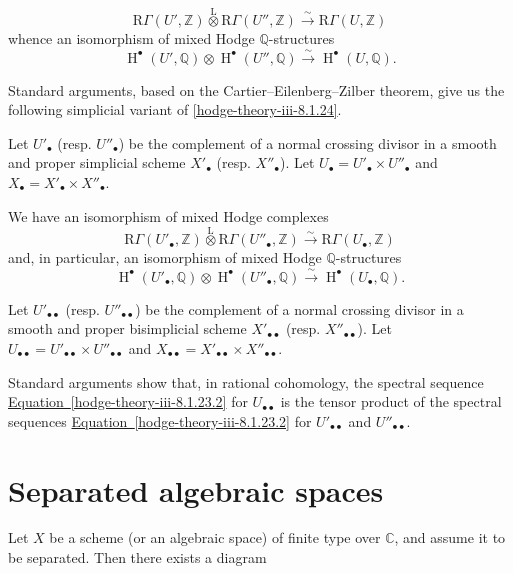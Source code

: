     \[       \mathrm {R}\Gamma (U',\mathbb {Z})\overset {\mathrm {L}}{\otimes }\mathrm {R}\Gamma (U'',\mathbb {Z})       \xrightarrow {\sim } \mathrm {R}\Gamma (U,\mathbb {Z})     \]
    whence an isomorphism of mixed Hodge \(\mathbb {Q}\)-structures
    \[       \operatorname {H}^\bullet (U',\mathbb {Q})\otimes \operatorname {H}^\bullet (U'',\mathbb {Q})       \xrightarrow {\sim } \operatorname {H}^\bullet (U,\mathbb {Q}).     \]\label{hodge-theory-iii-8.1.25}\par{}Standard arguments, based on the Cartier–Eilenberg–Zilber theorem, give us the following simplicial variant of \cref{hodge-theory-iii-8.1.24}.\par{}Let \(U'_\bullet \) (resp. \(U''_\bullet \)) be the complement of a normal crossing divisor in a smooth and proper simplicial scheme \(X'_\bullet \) (resp. \(X''_\bullet \)).
    Let \(U_\bullet =U'_\bullet \times  U''_\bullet \) and \(X_\bullet =X'_\bullet \times  X''_\bullet \).\par{}We have an isomorphism of mixed Hodge complexes
    \[       \mathrm {R}\Gamma (U'_\bullet ,\mathbb {Z})\overset {\mathrm {L}}{\otimes }\mathrm {R}\Gamma (U''_\bullet ,\mathbb {Z})       \xrightarrow {\sim } \mathrm {R}\Gamma (U_\bullet ,\mathbb {Z})     \]
    and, in particular, an isomorphism of mixed Hodge \(\mathbb {Q}\)-structures
    \[       \operatorname {H}^\bullet (U'_\bullet ,\mathbb {Q})\otimes \operatorname {H}^\bullet (U''_\bullet ,\mathbb {Q})       \xrightarrow {\sim } \operatorname {H}^\bullet (U_\bullet ,\mathbb {Q}).     \]\label{hodge-theory-iii-8.1.26}\par{}Let \(U'_{\bullet \bullet }\) (resp. \(U''_{\bullet \bullet }\)) be the complement of a normal crossing divisor in a smooth and proper bisimplicial scheme \(X'_{\bullet \bullet }\) (resp. \(X''_{\bullet \bullet }\)).
    Let \(U_{\bullet \bullet }=U'_{\bullet \bullet }\times  U''_{\bullet \bullet }\) and \(X_{\bullet \bullet }=X'_{\bullet \bullet }\times  X''_{\bullet \bullet }\).
    
    Standard arguments show that, in rational cohomology, the spectral sequence \hyperref[hodge-theory-iii-8.1.23.2]{Equation~\ref*{hodge-theory-iii-8.1.23.2}} for \(U_{\bullet \bullet }\) is the tensor product of the spectral sequences \hyperref[hodge-theory-iii-8.1.23.2]{Equation~\ref*{hodge-theory-iii-8.1.23.2}} for \(U'_{\bullet \bullet }\) and \(U''_{\bullet \bullet }\).\section{Separated algebraic spaces}\label{hodge-theory-iii-8.2}\label{hodge-theory-iii-8.2.1}\par{}Let \(X\) be a scheme (or an algebraic space) of finite type over \(\mathbb {C}\), and assume it to be separated.
    Then there exists a diagram

